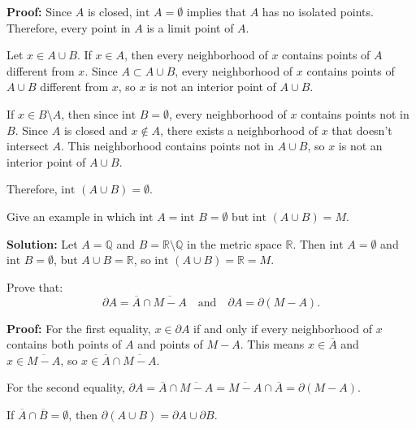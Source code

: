 \textbf{Proof:} Since $A$ is closed, $\text{int } A = \emptyset$ implies that $A$ has no isolated points. Therefore, every point in $A$ is a limit point of $A$.

Let $x \in A \cup B$. If $x \in A$, then every neighborhood of $x$ contains points of $A$ different from $x$. Since $A \subset A \cup B$, every neighborhood of $x$ contains points of $A \cup B$ different from $x$, so $x$ is not an interior point of $A \cup B$.

If $x \in B \setminus A$, then since $\text{int } B = \emptyset$, every neighborhood of $x$ contains points not in $B$. Since $A$ is closed and $x \notin A$, there exists a neighborhood of $x$ that doesn't intersect $A$. This neighborhood contains points not in $A \cup B$, so $x$ is not an interior point of $A \cup B$.

Therefore, $\text{int } (A \cup B) = \emptyset$.

\begin{problembox}
Give an example in which \(\text{int } A = \text{int } B = \emptyset\) but \(\text{int } (A \cup B) = M\).
\end{problembox}

\textbf{Solution:} Let $A = \mathbb{Q}$ and $B = \mathbb{R} \setminus \mathbb{Q}$ in the metric space $\mathbb{R}$. Then $\text{int } A = \emptyset$ and $\text{int } B = \emptyset$, but $A \cup B = \mathbb{R}$, so $\text{int } (A \cup B) = \mathbb{R} = M$.

\begin{problembox}
Prove that:
\[
\partial A = \overline{A} \cap \overline{M - A} \quad \text{and} \quad \partial A = \partial(M - A).
\]
\end{problembox}

\textbf{Proof:} For the first equality, $x \in \partial A$ if and only if every neighborhood of $x$ contains both points of $A$ and points of $M - A$. This means $x \in \overline{A}$ and $x \in \overline{M - A}$, so $x \in \overline{A} \cap \overline{M - A}$.

For the second equality, $\partial A = \overline{A} \cap \overline{M - A} = \overline{M - A} \cap \overline{A} = \partial(M - A)$.

\begin{problembox}
If \(\overline{A} \cap \overline{B} = \emptyset\), then \(\partial(A \cup B) = \partial A \cup \partial B\).
\end{problembox}

